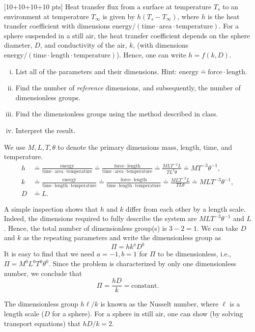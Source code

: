 \documentclass[12pt]{article}
\begin{document}
\begin{ex}

  [10+10+10+10 pts] Heat transfer flux from a surface at temperature $T_s$ to an environment at temperature $T_{\infty}$ is given by $h(T_s-T_{\infty})$, where $h$ is the heat transfer coefficient with dimensions $\mathrm{energy/(time\cdot area\cdot temperature)}$. For a sphere suspended in a still air, the heat transfer coefficient depends on the sphere diameter, $D$, and conductivity of the air, $k$, (with dimensions $\mathrm{energy/(time\cdot length\cdot temperature)}$). Hence, one can write $h=f(k,D)$.

\begin{enumerate}[(i)]
\item List all of the parameters and their dimensions. Hint: $\mathrm{energy}\doteq\mathrm{force\cdot length}$. 
\item Find the number of \emph{reference} dimensions, and subsequently, the number of dimensionless groups.
\item Find the dimensionless groups using the method described in class.
\item Interpret the result.
\end{enumerate}
  
\begin{solution}
  We use $M,L,T,\theta$ to denote the primary dimensions mass, length, time, and temperature.
  \begin{align*}
    h&\doteq\mathrm{\frac{energy}{time\cdot area\cdot temperature}}\doteq\mathrm{\frac{force\cdot length}{time\cdot area\cdot temperature}}\doteq\frac{MLT^{-2}L}{TL^2\theta}\doteq MT^{-3}\theta^{-1},\\
    k&\doteq\mathrm{\frac{energy}{time\cdot length\cdot temperature}}\doteq\mathrm{\frac{force\cdot length}{time\cdot length\cdot temperature}}\doteq\frac{MLT^{-2}L}{TL\theta}\doteq MLT^{-3}\theta^{-1},\\
    D&\doteq L.
  \end{align*}

  A simple inspection shows that $h$ and $k$ differ from each other by a length scale. Indeed, the dimensions required to fully describe the system are $MLT^{-3}\theta^{-1}$ and $L$. Hence, the total number of dimensionless group(s) is $3-2=1$. We can take $D$ and $k$ as the repeating parameters and write the dimensionless group as
  $$\Pi=h k^a D^b$$
  It is easy to find that we need $a=-1,b=1$ for $\Pi$ to be dimensionless, i.e., $\Pi=M^0L^0T^0\theta^0$. Since the problem is characterized by only one dimensionless number, we conclude that
  $$\Pi=\frac{hD}{k}=\mathrm{constant}.$$

  The dimensionless group $h\ell/k$ is known as the Nusselt number, where $\ell$ is a length scale ($D$ for a sphere). For a sphere in still air, one can show (by solving transport equations) that $hD/k=2$. 
\end{solution}  

\end{ex}
\end{document}

